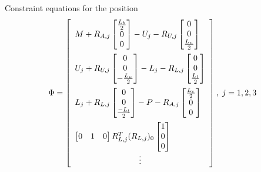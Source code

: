 Constraint equations for the position
\begin{equation}
    \Phi=
    \begin{bmatrix}
    \begin{array}{l} %
    M+R_{A,j}\begin{bmatrix}\frac{L_b}{2} \\ 0 \\0 \end{bmatrix} - U_j - R_{U,j} \begin{bmatrix}0\\ 0 \\\frac{L_u}{2}  \end{bmatrix}  \vspace{0.5em}\\
    U_j+R_{U,j}\begin{bmatrix}0 \\ 0 \\-\frac{L_u}{2} \end{bmatrix} - L_j - R_{L,j} \begin{bmatrix}0\\ 0 \\\frac{L_l}{2}  \end{bmatrix}  \vspace{0.5em}\\
    L_j+R_{L,j}\begin{bmatrix}0 \\ 0 \\ \frac{-L_l}{2} \end{bmatrix} - P - R_{A,j} \begin{bmatrix}\frac{L_e}{2}\\ 0 \\0 \end{bmatrix}  \vspace{0.5em} \\
    \begin{bmatrix} 0 & 1 & 0 \end{bmatrix}R_{L,j}^T(R_{L,j})_0\begin{bmatrix} 1\\ 0 \\0\end{bmatrix}
    \end{array}\\
    \vdots
    \end{bmatrix},\; j=1,2,3 \label{eq:Phi3D}
\end{equation}

